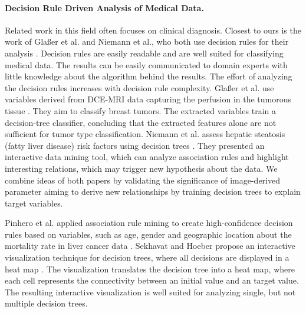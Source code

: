\documentclass[a4paper,twoside]{style/article}
\begin{document}
\paragraph{Decision Rule Driven Analysis of Medical Data.}
Related work in this field often focuses on clinical diagnosis.
Closest to ours is the work of Gla{\ss}er et al. and Niemann et al., who both use decision rules for their analysis \cite{Glasser2013,Niemann2014}.
Decision rules are easily readable and are well suited for classifying medical data.
The results can be easily communicated to domain experts with little knowledge about the algorithm behind the results.
The effort of analyzing the decision rules increases with decision rule complexity.
Gla{\ss}er et al. use variables derived from DCE-MRI data capturing the perfusion in the tumorous tissue \cite{Glasser2013}.
They aim to classify breast tumors.
The extracted variables train a decision-tree classifier, concluding that the extracted features alone are not sufficient for tumor type classification.
Niemann et al. assess hepatic steatosis (fatty liver disease) risk factors using decision trees \cite{Niemann2014}.
They presented an interactive data mining tool, which can analyze association rules and highlight interesting relations, which may trigger new hypothesis about the data.
We combine ideas of both papers by validating the significance of image-derived parameter aiming to derive new relationships by training decision trees to explain target variables.

Pinhero et al. applied association rule mining to create high-confidence decision rules based on variables, such as age, gender and geographic location about the mortality rate in liver cancer data \cite{Pinheiro}.
Sekhavat and Hoeber propose an interactive visualization technique for decision trees, where all decisions are displayed in a heat map \cite{Sekhavat}.
The visualization translates the decision tree into a heat map, where each cell represents the connectivity between an initial value and an target value.
The resulting interactive visualization is well suited for analyzing single, but not multiple decision trees.
\end{document}
